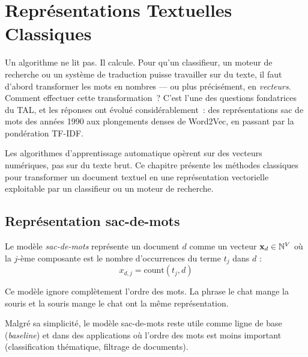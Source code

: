 \chapter{Repr\'esentations Textuelles Classiques}
\label{ch:representations}

Un algorithme ne lit pas. Il calcule. Pour qu'un classifieur, un moteur de
recherche ou un syst\`eme de traduction puisse travailler sur du texte, il
faut d'abord transformer les mots en nombres --- ou plus pr\'ecis\'ement, en
\emph{vecteurs}. Comment effectuer cette transformation~? C'est l'une des
questions fondatrices du TAL, et les r\'eponses ont \'evolu\'e
consid\'erablement~: des repr\'esentations \og sac de mots\fg{} des ann\'ees
1990 aux plongements denses de Word2Vec, en passant par la pond\'eration
TF-IDF.

\begin{intuition}[title=\textbf{Du texte aux vecteurs}]
Les algorithmes d'apprentissage automatique op\`erent sur des vecteurs
num\'eriques, pas sur du texte brut. Ce chapitre pr\'esente les m\'ethodes
classiques pour transformer un document textuel en une repr\'esentation
vectorielle exploitable par un classifieur ou un moteur de recherche.
\end{intuition}

\section{Repr\'esentation sac-de-mots}
\label{sec:rep:bow}

\begin{definition}
Le mod\`ele \emph{sac-de-mots} repr\'esente un document $d$ comme un vecteur
$\mathbf{x}_d \in \mathbb{N}^V$ o\`u la $j$-\`eme composante est le nombre
d'occurrences du terme $t_j$ dans $d$ :
\[
x_{d,j} = \text{count}(t_j, d)
\]
\end{definition}

Ce mod\`ele ignore compl\`etement l'ordre des mots. La phrase \og le chat mange
la souris \fg et \og la souris mange le chat \fg ont la m\^eme
repr\'esentation.

\begin{remarque}
Malgr\'e sa simplicit\'e, le mod\`ele sac-de-mots reste utile comme ligne de
base (\emph{baseline}) et dans des applications o\`u l'ordre des mots est
moins important (classification th\'ematique, filtrage de documents).
\end{remarque}

